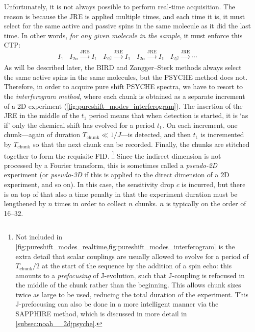 Unfortunately, it is not always possible to perform real-time acquisition.
The reason is because the JRE is applied multiple times, and each time it is, it must select for the same active and passive spins in the same molecule as it did the last time.
In other words, \textit{for any given molecule in the sample}, it must enforce this CTP:
\begin{equation}
    \label{eq:real_time_pureshift}
    I_{1-}I_{2\alpha} \xrightarrow[]{\text{JRE}} I_{1-}I_{2\beta} \xrightarrow[]{\text{JRE}} I_{1-}I_{2\alpha} \xrightarrow[]{\text{JRE}} I_{1-}I_{2\beta} \xrightarrow[]{\text{JRE}} \cdots
\end{equation}
As will be described later, the BIRD and Zangger--Sterk methods always select the same active spins in the same molecules, but the PSYCHE method does not.
Therefore, in order to acquire pure shift PSYCHE spectra, we have to resort to the \textit{interferogram method}, where each chunk is obtained as a separate increment of a 2D experiment (\cref{fig:pureshift_modes_interferogram}).
The insertion of the JRE in the middle of the $t_1$ period means that when detection is started, it is `as if' only the chemical shift has evolved for a period $t_1$.
On each increment, one chunk---again of duration $T_\text{chunk} \ll 1/J$---is detected, and then $t_1$ is incremented by $T_\text{chunk}$ so that the next chunk can be recorded.
Finally, the chunks are stitched together to form the requisite FID.%
\footnote{Not included in \cref{fig:pureshift_modes_realtime,fig:pureshift_modes_interferogram} is the extra detail that scalar couplings are usually allowed to evolve for a period of $T_\text{chunk}/2$ at the start of the sequence by the addition of a spin echo: this amounts to a \textit{prefocusing} of J-evolution, such that J-coupling is refocused in the middle of the chunk rather than the beginning\autocite{Aguilar2010ACIE}.
This allows chunk sizes twice as large to be used, reducing the total duration of the experiment.
This J-prefocusing can also be done in a more intelligent manner via the SAPPHIRE method\autocite{Moutzouri2017CC}, which is discussed in more detail in \cref{subsec:noah__2djpsyche}.}
Since the indirect dimension is not processed by a Fourier transform, this is sometimes called a \textit{pseudo-2D} experiment (or \textit{pseudo-3D} if this is applied to the direct dimension of a 2D experiment, and so on).
In this case, the sensitivity drop $c$ is incurred, but there is on top of that also a time penalty in that the experiment duration must be lengthened by $n$ times in order to collect $n$ chunks.
$n$ is typically on the order of 16--32.
